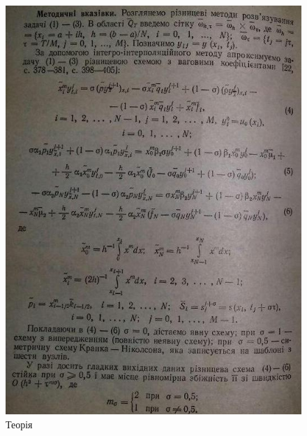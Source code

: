\documentclass[fontsize=14pt,DIV=1,a4paper]{scrartcl}
\begin{document}
	\begin{figure}[h!]
		\includegraphics[scale=1.1]{th_ii2.jpg}
		\centering
		\caption{Теорія}
	\end{figure}
	
\end{document}
